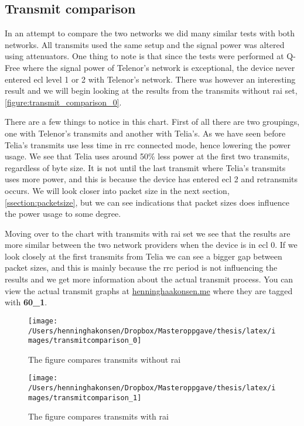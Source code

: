 \documentclass[USenglish]{ifimaster}  %
\begin{document}
\subsection{Transmit comparison}
In an attempt to compare the two networks we did many similar tests with both networks. All transmits used the same setup and the signal power was altered using attenuators. One thing to note is that since the tests were performed at Q-Free where the signal power of Telenor's network is exceptional, the device never entered \acrshort{ecl} level 1 or 2 with Telenor's network. There was however an interesting result and we will begin looking at the results from the transmits without \acrshort{rai} set, \vref{figure:transmit_comparison_0}.

There are a few things to notice in this chart. First of all there are two groupings, one with Telenor's transmits and another with Telia's. As we have seen before Telia's transmits use less time in \acrshort{rrc} connected mode, hence lowering the power usage. We see that Telia uses around 50\% less power at the first two transmits, regardless of byte size. It is not until the last transmit where Telia's transmits uses more power, and this is because the device has entered \acrshort{ecl} 2 and retransmits occurs.
We will look closer into packet size in the next section, \vref{ssection:packetsize}, but we can see indications that packet sizes does influence the power usage to some degree.

Moving over to the chart with transmits with \acrshort{rai} set we see that the results are more similar between the two network providers when the device is in \acrshort{ecl} 0. If we look closely at the first transmits from Telia we can see a bigger gap between packet sizes, and this is mainly because the \acrshort{rrc} period is not influencing the results and we get more information about the actual transmit process.
You can view the actual transmit graphs at \url{henninghaakonsen.me} where they are tagged with \textbf{60\_1}.

\begin{figure}[H]
  \centering\texttt{[image: /Users/henninghakonsen/Dropbox/Masteroppgave/thesis/latex/images/transmitcomparison\_0]}
  \caption[Short-term test - comparison without \acrshort{rai}]{The figure compares transmits without \acrshort{rai}}
  \label{figure:transmit_comparison_0}
\end{figure}

\begin{figure}[H]
  \centering\texttt{[image: /Users/henninghakonsen/Dropbox/Masteroppgave/thesis/latex/images/transmitcomparison\_1]}
  \caption[Short-term test - comparison with \acrshort{rai}]{The figure compares transmits with \acrshort{rai}}
  \label{figure:transmit_comparison_1}
\end{figure}
\end{document}
